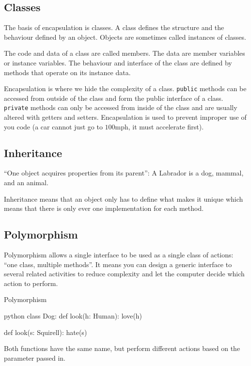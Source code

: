 \subsection{Classes}\label{sub:classes}

The basis of encapsulation is classes.
A class defines the structure and the behaviour defined by an object.
Objects are sometimes called instances of classes.

The code and data of a class are called members.
The data are member variables or instance variables.
The behaviour and interface of the class are defined by methods that operate on its instance data.

Encapsulation is where we hide the complexity of a class.
\texttt{public} methods can be accessed from outside of the class and form the public interface of a class.
\texttt{private} methods can only be accessed from inside of the class and are usually altered with getters and setters.
Encapsulation is used to prevent improper use of you code (a car cannot just go to \(100\)mph, it must accelerate first).

\subsection{Inheritance}\label{sub:inheritance}

``One object acquires properties from its parent'': A Labrador is a dog, mammal, and an animal.

Inheritance means that an object only has to define what makes it unique which means that there is only ever one implementation for each method.

\subsection{Polymorphism}\label{sub:polymorphism}

Polymorphism allows a single interface to be used as a single class of actions: ``one class, multiple methods''.
It means you can design a generic interface to several related activities to reduce complexity and let the computer decide which action to perform.
%
\begin{highlight}{Polymorphism}
    \begin{code}{python}
        class Dog:
            def look(h: Human):
                love(h)

            def look(s: Squirell):
                hate(s)
    \end{code}
\end{highlight}
%
Both functions have the same name, but perform different actions based on the parameter passed in.
